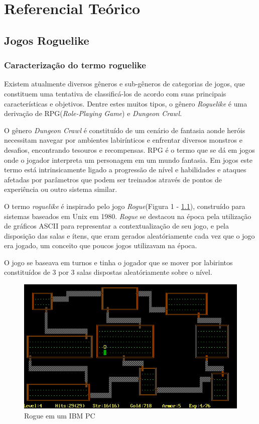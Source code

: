 \chapter[Referencial Teórico]{Referencial Teórico}


\section{Jogos Roguelike}
	\subsection{Caracterização do termo roguelike}
Existem atualmente diversos gêneros e sub-gêneros de categorias de jogos, que constituem uma tentativa de classificá-los de acordo com suas principais características e objetivos. Dentre estes muitos tipos, o gênero \textit{Roguelike} é uma derivação de RPG(\textit{Role-Playing Game}) e \textit{Dungeon Crawl}. 


O gênero \textit{Dungeon Crawl} é constituído de um cenário de fantasia aonde heróis necessitam navegar por ambientes labirínticos e enfrentar diversos monstros e desafios, encontrando tesouros e recompensas. RPG é o termo que se dá em jogos onde o jogador interpreta um personagem em um mundo fantasia. Em jogos este termo está intrinsicamente ligado a progressão de nível e habilidades e ataques afetadas por parâmetros que podem ser treinados através de pontos de experiência ou outro sistema similar. 


O termo \textit{roguelike} é inspirado pelo jogo \textit{Rogue}(Figura 1 - \ref{fig01}), construído para sistemas baseados em Unix em 1980. \textit{Rogue} se destacou na época pela utilização de gráficos ASCII para representar a contextualização de seu jogo, e pela disposição das salas e ítens, que eram gerados aleatóriamente cada vez que o jogo era jogado, um conceito que poucos jogos utilizavam na época. 


O jogo se baseava em turnos e tinha o jogador que se mover por labirintos constituídos de 3 por 3 salas dispostas aleatóriamente sobre o nível. 

\begin{figure}[h]
	\centering
	\label{fig01}
		\includegraphics[keepaspectratio=true,scale=0.5]{figuras/fig01-rogue_IBM.PNG}
	\caption{Rogue em um IBM PC}
\end{figure}


